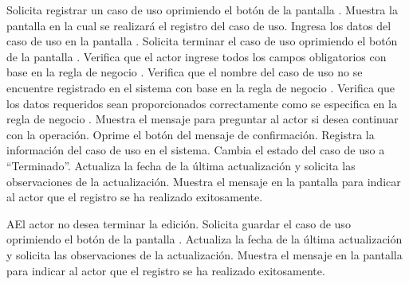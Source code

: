 \begin{UCtrayectoria}
    \UCpaso[\UCactor] Solicita registrar un caso de uso oprimiendo el botón \btnNuevo de la pantalla .
    \UCpaso[\UCsist] Muestra la pantalla  en la cual se realizará el registro del caso de uso. 
    \UCpaso[\UCactor] Ingresa los datos del caso de uso en la pantalla . \label{cu5.1:ingresaDatos}
    \UCpaso[\UCactor] Solicita terminar el caso de uso oprimiendo el botón  de la pantalla .   
    \UCpaso[\UCsist] Verifica que el actor ingrese todos los campos obligatorios con base en la regla de negocio  .
    \UCpaso[\UCsist] Verifica que el nombre del caso de uso no se encuentre registrado en el sistema con base en la regla de negocio  .
    \UCpaso[\UCsist] Verifica que los datos requeridos sean proporcionados correctamente como se especifica en la regla de negocio .    
    \UCpaso[\UCsist] Muestra el mensaje  para preguntar al actor si desea continuar con la operación.
    \UCpaso[\UCactor] Oprime el botón  del mensaje de confirmación. 
    \UCpaso[\UCsist] Registra la información del caso de uso en el sistema.
    \UCpaso[\UCsist] Cambia el estado del caso de uso a ``Terminado''.
    \UCpaso[\UCsist] Actualiza la fecha de la última actualización y solicita las observaciones de la actualización.
    \UCpaso[\UCsist] Muestra el mensaje  en la pantalla  
    para indicar al actor que el registro se ha realizado exitosamente.
 \end{UCtrayectoria}
 \begin{UCtrayectoriaA}{A}{El actor no desea terminar la edición.}
    \UCpaso[\UCactor] Solicita guardar el caso de uso oprimiendo el botón  de la pantalla .
    \UCpaso[\UCsist] Actualiza la fecha de la última actualización y solicita las observaciones de la actualización.
    \UCpaso[\UCsist] Muestra el mensaje  en la pantalla  
    para indicar al actor que el registro se ha realizado exitosamente.
 \end{UCtrayectoriaA}
